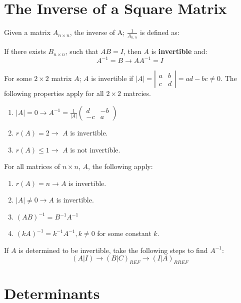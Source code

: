 \documentclass[a4paper]{article}
\begin{document}
  \section{The Inverse of a Square Matrix}
  Given a matrix $A_{n\times n}$, the inverse of A; $\frac{1 }{A_{n,n}}$ is defined as:
  \begin{defn}
    If there exists $B_{n\times n}$, such that $AB=I$, then $A$ is \textbf{invertible} and:
    \[
      A^{-1}=B\rightarrow AA^{-1} = I
    \]
  \end{defn}
  \noindent
  For some $2\times 2$ matrix $A$; $A$ is invertible if $|A| = |\begin{smallmatrix} a & b \\ c & d \end{smallmatrix}| = ad - bc \neq 0$. The following properties apply for all $2\times 2$ matrcies.
  \begin{enumerate}
    \item $|A| = 0 \rightarrow A^{-1} = \frac{1 }{|A|} \begin{pmatrix}
        d & -b \\
        -c & a
    \end{pmatrix}$
  \item $r(A) = 2 \rightarrow$ $A$ is invertible.
  \item $r(A) \le 1 \rightarrow$ $A$ is not invertible.
  \end{enumerate}
  For all matrices of $n \times n$, $A$, the following apply:
  \begin{enumerate}
    \item $r(A) = n \rightarrow A$ is invertible.
    \item $|A| \neq 0 \rightarrow A$ is invertible.
    \item $(AB)^{-1} = B^{-1}A^{-1}$
    \item $(kA)^{-1} = k^{-1}A^{-1}, k \neq 0$ for some constant $k$.
  \end{enumerate}
  If $A$ is determined to be invertible, take the following steps to find $A^{-1}$:
  \[
    (A|I) \rightarrow (B|C)_{REF} \rightarrow (I|A)_{RREF}
  \]
  \section{Determinants} 
\end{document}
